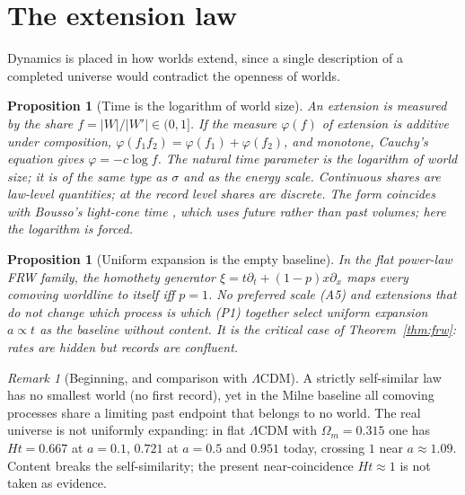 \documentclass[11pt]{article}
\newtheorem{proposition}[theorem]{Proposition}
\theoremstyle{definition}
\theoremstyle{remark}
\newtheorem{remark}[theorem]{Remark}
\begin{document}
\section{The extension law}\label{sec:extension}

Dynamics is placed in how worlds extend, since a single description of a completed universe would contradict the openness of worlds.

\begin{proposition}[Time is the logarithm of world size]
An extension is measured by the share $f=|W|/|W'|\in(0,1]$. If the measure $\varphi(f)$ of extension is additive under composition, $\varphi(f_1f_2)=\varphi(f_1)+\varphi(f_2)$, and monotone, Cauchy's equation gives $\varphi=-c\log f$. The natural time parameter is the logarithm of world size; it is of the same type as $\sigma$ and as the energy scale. Continuous shares are law-level quantities; at the record level shares are discrete. The form coincides with Bousso's light-cone time \cite{bousso}, which uses future rather than past volumes; here the logarithm is forced.
\end{proposition}

\begin{proposition}[Uniform expansion is the empty baseline]
In the flat power-law FRW family, the homothety generator $\xi=t\partial_t+(1-p)x\partial_x$ maps every comoving worldline to itself iff $p=1$. No preferred scale (A5) and extensions that do not change which process is which (P1) together select uniform expansion $a\propto t$ as the baseline without content. It is the critical case of Theorem~\ref{thm:frw}: rates are hidden but records are confluent.
\end{proposition}

\begin{remark}[Beginning, and comparison with $\Lambda$CDM]
A strictly self-similar law has no smallest world (no first record), yet in the Milne baseline all comoving processes share a limiting past endpoint that belongs to no world. The real universe is not uniformly expanding: in flat $\Lambda$CDM with $\Omega_m=0.315$ \cite{planck} one has $Ht=0.667$ at $a=0.1$, $0.721$ at $a=0.5$ and $0.951$ today, crossing $1$ near $a\approx1.09$. Content breaks the self-similarity; the present near-coincidence $Ht\approx1$ is not taken as evidence.
\end{remark}

\end{document}
